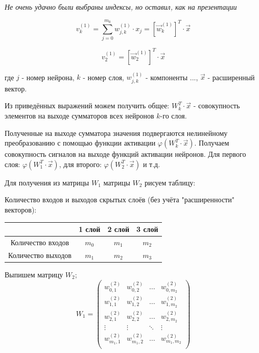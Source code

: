 \documentclass{article}
\begin{document}
\begin{myquote}
    \textit{Не очень удачно были выбраны индексы, но оставил, как на презентации}
\end{myquote}

\begin{equation}
    {v}_k^{(1)} = \sum_{j=0}^{m_0} w_{j,k}^{(1)} \cdot x_j = [\vec{w}_{k}^{(1)}]^T \cdot \vec{x}
\end{equation}


\begin{equation*}
    {v}_2^{(1)} = [\vec{w}_{2}^{(1)}]^T \cdot \vec{x}
\end{equation*}

где $j$ - номер нейрона, $k$ - номер слоя, $w_{j,k}^{(1)}$ - компоненты ..., $\vec{x}$ - расширенный вектор.

Из приведённых выражений можем получить общее: $W_k^T \cdot \vec{x}$ - совокупность элементов на выходе сумматоров всех нейронов $k$-го слоя.

Полученные на выходе сумматора значения подвергаются нелинейному преобразованию с помощью функции активации $\varphi(W_k^T \cdot \vec{x})$. Получаем совокупность сигналов на выходе функций активации нейронов. 
Для первого слоя: $\varphi(W_1^T \cdot \vec{x})$, для второго: $\varphi(W_2^T \cdot \vec{x})$ и т.д.

Для получения из матрицы $W_1$ матрицы $W_2$ рисуем таблицу:

\begin{center}
    Количество входов и выходов скрытых слоёв (без учёта "расширенности" векторов):

    \begin{tabular}{c | c |  c | c |}
        & 1 слой & 2 слой & 3 слой \\
        \hline
        Количество входов  & $m_0$ & $m_1$ & $m_2$ \\
        \hline
        Количество выходов & $m_1$ & $m_2$ & $m_3$ \\
        \hline
    \end{tabular}
\end{center}

Выпишем матрицу $W_2$;
\begin{equation}
    W_1 = 
    \begin{pmatrix}
        w_{0,1}^{(2)} & w_{0,2}^{(2)} & \dots & w_{0,{m_2}}^{(2)} \\
        w_{1,1}^{(2)} & w_{1,2}^{(2)} & \dots & w_{1,{m_2}}^{(2)} \\
        w_{2,1}^{(2)} & w_{2,2}^{(2)} & \dots & w_{2,{m_2}}^{(2)} \\
        \vdots        & \vdots        & \ddots & \vdots           \\
        w_{{m_1},1}^{(2)} & w_{{m_1},2}^{(2)} & \dots & w_{{m_1},{m_2}}^{(2)} \\
    \end{pmatrix}
\end{equation}
\end{document}
